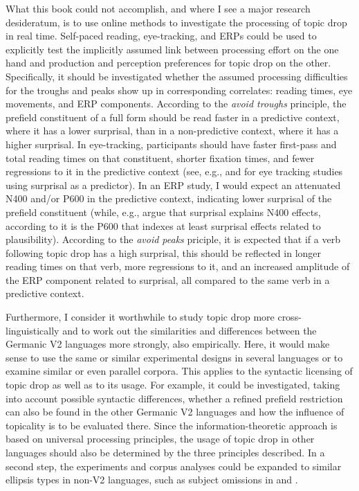 What this book could not accomplish, and where I see a major research desideratum, is to use online methods to investigate the processing of topic drop in real time. 
Self-paced reading, eye-tracking, and ERPs could be used to explicitly test the implicitly assumed link between processing effort  on the one hand and production and perception preferences for topic drop on the other.
Specifically, it should be investigated whether the assumed processing difficulties for the troughs and peaks show up in corresponding correlates: reading times, eye movements, and ERP components. 
According to the \textit{avoid troughs} principle, the prefield constituent of a full form should be read faster in a predictive context, where it has a lower surprisal, than in a non-predictive context, where it has a higher surprisal.
In eye-tracking, participants should have faster first-pass and total reading times on that constituent, shorter fixation times, and fewer regressions to it in the predictive context (see, e.g., \cite{demberg.keller2008} and \cite{boston.etal2008} for eye tracking studies using surprisal as a predictor).
In an ERP study, I would expect an attenuated N400 and/or P600 in the predictive context, indicating lower surprisal of the prefield constituent (while, e.g., \cite{frank.etal2015, michaelov.etal2023} argue that surprisal explains N400 effects, according to \cite{brouwer.etal2021} it is the P600 that indexes at least surprisal effects related to plausibility).
According to the \textit{avoid peaks} priciple, it is expected that if a verb following topic drop has a high surprisal, this should be reflected in longer reading times on that verb, more regressions to it, and an increased amplitude of the ERP component related to surprisal, all compared to the same verb in a predictive context.

Furthermore, I consider it worthwhile to study topic drop more cross\hyp linguistically and to work out the similarities and differences between the Germanic V2 languages  more strongly, also empirically.
Here, it would make sense to use the same or similar experimental designs in several languages or to examine similar or even parallel corpora.
This applies to the syntactic licensing of topic drop as well as to its usage.
For example, it could be investigated, taking into account possible syntactic differences, whether a refined prefield restriction can also be found in the other Germanic V2 languages  and how the influence of topicality is to be evaluated there.
Since the information-theoretic approach is based on universal processing principles, the usage of topic drop in other languages should also be determined by the three principles described.
In a second step, the experiments and corpus analyses could be expanded to similar ellipsis types in non-V2 languages, such as subject omissions in  and .

